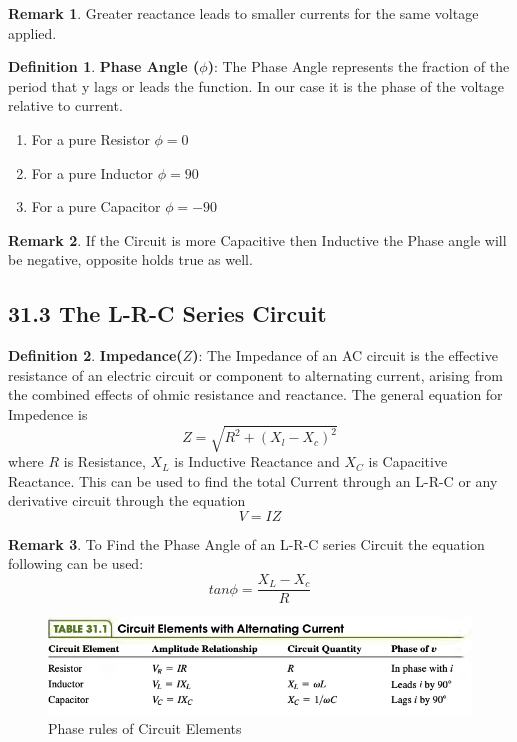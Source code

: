 \documentclass[12pt]{amsart}
\theoremstyle{definition}
\newtheorem{definition}{Definition} %
\newtheorem*{remark}{Remark}        %
\numberwithin{equation}{theorem}    %
\begin{document}
\begin{remark}
    Greater reactance leads to smaller currents for the same voltage applied. 
\end{remark}

\begin{definition}
    \textbf{Phase Angle ($\phi$)}:
    The Phase Angle represents the fraction of the period that y lags or leads the function. In our case it is the phase of the voltage relative to current.
    \begin{enumerate}
        \item For a pure Resistor $\phi = 0$
        \item For a pure Inductor $\phi = 90$
        \item For a pure Capacitor $\phi = -90$
    \end{enumerate}
   
    \begin{remark}
        If the Circuit is more Capacitive then Inductive the Phase angle will be negative, opposite holds true as well.
    \end{remark}
\end{definition}

\subsection*{31.3 The L-R-C Series Circuit}

\begin{definition}
    \textbf{Impedance($Z$)}:
    The Impedance of an AC circuit is the effective resistance of an electric circuit or component to alternating current, arising from the combined effects of ohmic resistance and reactance. The general equation for Impedence is  $$Z = \sqrt{R^2 + (X_l - X_c)^2}$$ where $R$ is Resistance, $X_L$ is Inductive Reactance and $X_C$ is Capacitive Reactance. This can be used to find the total Current through an L-R-C or any derivative circuit through the equation $$V = IZ$$

    \begin{remark}
        To Find the Phase Angle of an L-R-C series Circuit the equation following can be used:
        $$tan\phi = \frac{X_L- X_c}{R}$$
    \end{remark}
\end{definition}

\begin{figure}[H]
    \centering
    \includegraphics[width=5in]{Media/Elements.png}
    \caption{Phase rules of Circuit Elements}
    \label{Phase Rules of Circuit Elements}
\end{figure}
\end{document}
